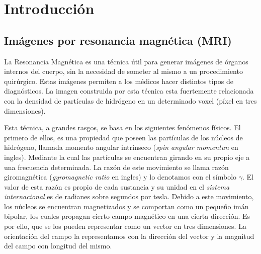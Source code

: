 \chapter{Introducci\'on}

\section{Imágenes por resonancia magnética (MRI)}




La Resonancia Magn\'etica es una t\'ecnica útil para generar im\'agenes de 
\'organos internos del cuerpo, sin la necesidad de someter al mismo a un 
procedimiento quir\'urgico. Estas im\'agenes permiten a los m\'edicos hacer distintos tipos de 
diagn\'osticos. La imagen construida por esta t\'ecnica esta fuertemente 
relacionada con la densidad de part\'iculas de hidr\'ogeno en un determinado 
voxel (p\'ixel en tres dimensiones).

Esta t\'ecnica, a grandes rasgos, se basa en los siguientes fen\'omenos f\'isicos. El primero de 
ellos, es 
una propiedad que poseen las part\'iculas de los n\'ucleos de hidr\'ogeno, 
llamada momento angular intrínseco (\textit{spin angular momentun} en ingles). 
Mediante la cual las part\'iculas se encuentran girando en su 
propio eje a una frecuencia determinada. La razón de este movimiento se llama razón 
giromagnética (\textit{gyromagnetic 
ratio} en ingles) y lo denotamos con el símbolo $\gamma$. El valor de esta 
razón es propio de cada sustancia y su unidad en el 
\textit{sistema internacional} es de radianes sobre segundos por tesla. Debido 
a este movimiento, los n\'ucleos se encuentran 
magnetizados y se comportan como un peque\~no im\'an bipolar, los cuales 
propagan cierto campo magn\'etico en una cierta direcci\'on. Es por ello, que se los pueden 
representar como un vector en tres dimensiones. La orientaci\'on del campo la representamos con 
la direcci\'on del vector y la magnitud del campo con longitud del mismo.

